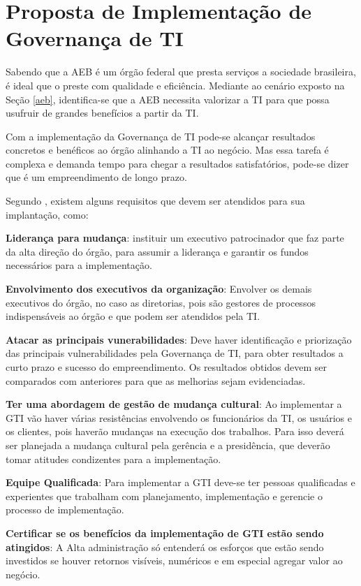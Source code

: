 \section{Proposta de Implementação de Governança de TI}\label{sec:proposta}

Sabendo que a AEB é um órgão federal que presta serviços a sociedade brasileira, é ideal que o preste com  qualidade e eficiência. Mediante ao cenário exposto na Seção \ref{aeb}, identifica-se que a AEB necessita valorizar a TI para que possa usufruir de grandes benefícios a partir da TI.

Com a implementação da Governança de TI pode-se alcançar resultados concretos e benéficos ao órgão alinhando a TI ao negócio. Mas essa tarefa é complexa e demanda tempo para chegar a resultados satisfatórios, pode-se dizer que é um empreendimento de longo prazo.

 Segundo \cite{ImplantandoGTI:2012}, existem alguns requisitos que devem ser atendidos para sua implantação, como:

\textbf{Liderança para mudança}: instituir um executivo patrocinador que faz parte da alta direção do órgão, para assumir a liderança e garantir os fundos necessários para a implementação.

\textbf{Envolvimento dos executivos da organização}: Envolver os demais executivos do órgão, no caso as diretorias, pois são gestores de processos indispensáveis ao órgão e que podem ser atendidos pela TI.

\textbf{Atacar as principais vunerabilidades}: Deve haver identificação e priorização das principais vulnerabilidades pela Governança de TI, para obter resultados a curto prazo e sucesso do empreendimento. Os resultados obtidos devem ser comparados com anteriores para que as melhorias sejam evidenciadas.

\textbf{Ter uma abordagem de gestão de mudança cultural}: Ao implementar a GTI vão haver várias resistências envolvendo os funcionários da TI, os usuários e os clientes, pois haverão mudanças na execução dos trabalhos. Para isso deverá ser planejada a mudança cultural pela gerência e a presidência, que deverão tomar atitudes condizentes para a implementação.

\textbf{Equipe Qualificada}: Para implementar a GTI deve-se ter pessoas qualificadas e experientes que trabalham com planejamento, implementação e gerencie o processo de implementação.

\textbf{Certificar se os benefícios da implementação de GTI estão sendo atingidos}: A Alta administração só entenderá os esforços que estão sendo investidos se houver retornos visíveis, numéricos e em especial agregar valor ao negócio.


